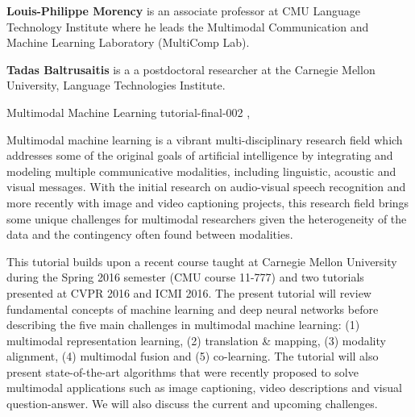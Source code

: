 \begin{bio}
  {\bfseries Louis-Philippe Morency} is an associate professor at CMU Language
  Technology Institute where he leads the Multimodal Communication and Machine
  Learning Laboratory (MultiComp Lab). 

  {\bfseries Tadas Baltrusaitis} is a a postdoctoral researcher at the Carnegie
  Mellon University, Language Technologies Institute.

\end{bio}

\begin{tutorial}
  {Multimodal Machine Learning}
  {tutorial-final-002}
  {\daydateyear, \tutorialmorningtime}
  {\TutLocB}

Multimodal machine learning is a vibrant multi-disciplinary research field
which addresses some of the original goals of artificial intelligence by
integrating and modeling multiple communicative modalities, including
linguistic, acoustic and visual messages. With the initial research on
audio-visual speech recognition and more recently with image and video
captioning projects, this research field brings some unique challenges for
multimodal researchers given the heterogeneity of the data and the contingency
often found between modalities.

This tutorial builds upon a recent course taught at Carnegie Mellon University
during the Spring 2016 semester (CMU course 11-777) and two tutorials
presented at CVPR 2016 and ICMI 2016. The present tutorial will review
fundamental concepts of machine learning and deep neural networks before
describing the five main challenges in multimodal machine learning: (1)
multimodal representation learning, (2) translation \& mapping, (3) modality
alignment, (4) multimodal fusion and (5) co-learning. The tutorial will also
present state-of-the-art algorithms that were recently proposed to solve
multimodal applications such as image captioning, video descriptions and
visual question-answer. We will also discuss the current and upcoming
challenges.

\end{tutorial}
